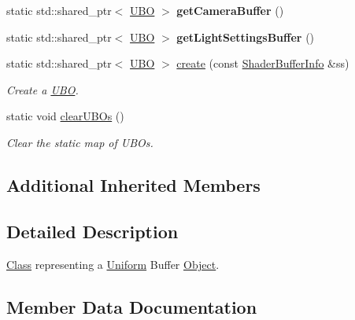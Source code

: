 \begin{DoxyCompactItemize}
static std\+::shared\+\_\+ptr$<$ \mbox{\hyperlink{classrev_1_1_u_b_o}{U\+BO}} $>$ {\bfseries get\+Camera\+Buffer} ()
\item 
\mbox{\label{classrev_1_1_u_b_o_a2d72e9e68f218de2d3b856c7115b0d97}} 
static std\+::shared\+\_\+ptr$<$ \mbox{\hyperlink{classrev_1_1_u_b_o}{U\+BO}} $>$ {\bfseries get\+Light\+Settings\+Buffer} ()
\item 
\mbox{\label{classrev_1_1_u_b_o_adc62687d84b4a6e838eec1c3e64c9031}} 
static std\+::shared\+\_\+ptr$<$ \mbox{\hyperlink{classrev_1_1_u_b_o}{U\+BO}} $>$ \mbox{\hyperlink{classrev_1_1_u_b_o_adc62687d84b4a6e838eec1c3e64c9031}{create}} (const \mbox{\hyperlink{structrev_1_1_shader_buffer_info}{Shader\+Buffer\+Info}} \&ss)
\begin{DoxyCompactList}\small\item\em Create a \mbox{\hyperlink{classrev_1_1_u_b_o}{U\+BO}}. \end{DoxyCompactList}\item 
\mbox{\label{classrev_1_1_u_b_o_af13363564831fb3754f0ea12a1717ea1}} 
static void \mbox{\hyperlink{classrev_1_1_u_b_o_af13363564831fb3754f0ea12a1717ea1}{clear\+U\+B\+Os}} ()
\begin{DoxyCompactList}\small\item\em Clear the static map of U\+B\+Os. \end{DoxyCompactList}\end{DoxyCompactItemize}
\subsection*{Additional Inherited Members}


\subsection{Detailed Description}
\mbox{\hyperlink{struct_class}{Class}} representing a \mbox{\hyperlink{structrev_1_1_uniform}{Uniform}} Buffer \mbox{\hyperlink{classrev_1_1_object}{Object}}. 

\subsection{Member Data Documentation}
\mbox{\label{classrev_1_1_u_b_o_a6ab2b09b1c7b5dfc548111d73a52020d}} 
